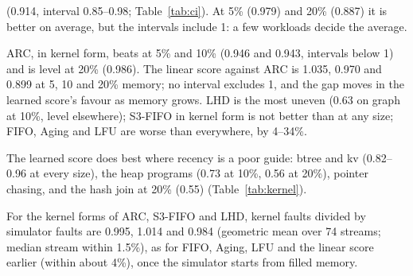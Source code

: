\begin{table}[t]
\caption{\textbf{Every policy on every workload, in the xv6 kernel, at 10\% memory} (74
streams). Faults relative to \clock: one column per workload (geometric mean over its
streams), last column the mean over the 14 workloads. ARC, LHD and S3-FIFO in the form a
kernel can run. The 5\% and 20\% tables are in Appendix~\ref{app:results}.}
\label{tab:kernel}
\vskip 0.1in
\begin{center}
\resizebox{\textwidth}{!}{}
\end{center}
\vskip -0.1in
\end{table}

\begin{table}[t]
\caption{The comparisons that matter, with 95\% intervals (resampling workloads, then
streams). Bold: the whole interval is below 1. Rows with CNN, MLP, set-attention and
trees use the ten streams those models ran on.}
\label{tab:ci}
\vskip 0.1in
\begin{center}
\resizebox{\linewidth}{!}{}
\end{center}
\vskip -0.1in
\end{table}

 (0.914, interval 0.85--0.98;
Table~\ref{tab:ci}). At 5\% (0.979) and 20\% (0.887) it is better on average, but the
intervals include 1: a few workloads decide the average.

 ARC, in kernel form, beats \clock at 5\% and
10\% (0.946 and 0.943, intervals below 1) and is level at 20\% (0.986). The linear score
against ARC is 1.035, 0.970 and 0.899 at 5, 10 and 20\% memory; no interval excludes 1,
and the gap moves in the learned score's favour as memory grows. LHD is the most uneven
(0.63 on graph at 10\%, level elsewhere); S3-FIFO in kernel form is not better than
\clock at any size; FIFO, Aging and LFU are worse than \clock everywhere, by 4--34\%.

 The learned score does best where recency is a poor guide:
btree and kv (0.82--0.96 at every size), the heap programs (0.73 at 10\%, 0.56 at 20\%),
pointer chasing, and the hash join at 20\% (0.55) (Table~\ref{tab:kernel}).

 For the kernel forms of ARC, S3-FIFO and LHD,
kernel faults divided by simulator faults are 0.995, 1.014 and 0.984 (geometric mean
over 74 streams; median stream within 1.5\%), as for FIFO, Aging, LFU and the linear
score earlier (within about 4\%), once the simulator starts from filled memory.

